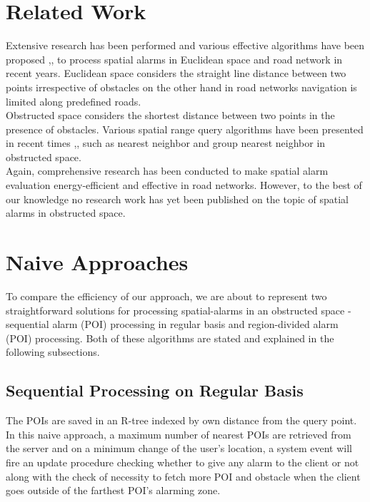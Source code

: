 \documentclass{sig-alternate}
\begin{document}
\section{Related Work}
Extensive research has been performed and various  effective algorithms have been proposed \cite{roadalarm},\cite{mur},\cite{bamba} to process spatial alarms in Euclidean space and road network in recent years. Euclidean space considers the straight line distance between two points irrespective of obstacles on the other hand in road networks navigation is limited along predefined roads.\\ Obstructed space considers the shortest distance between two points in the presence of obstacles. Various spatial range query algorithms have been presented in recent times \cite{obst1},\cite{obst2},\cite{ognn} such as nearest neighbor and group nearest neighbor in obstructed space.\\
Again, comprehensive research \cite{liu} has been conducted to make spatial alarm evaluation energy-efficient and effective in road networks. 
However, to the best of our knowledge no research work has yet been published on the topic of spatial alarms in obstructed space.
\\

\section{Naive Approaches}
To compare the efficiency of our approach, we are about to represent two straightforward solutions for processing spatial-alarms in an obstructed space - sequential alarm (POI) processing in regular basis and region-divided alarm (POI) processing. 
Both of these algorithms are stated and explained in the following subsections.


\subsection{Sequential Processing on Regular Basis}
The POIs are saved in an R-tree indexed by own distance from the query point. In this naive approach, a maximum number of nearest POIs are retrieved from the server and on a minimum change of the user's location, a system event will fire an update procedure checking whether to give any alarm to the client or not along with the check of necessity to fetch more POI and obstacle when the client goes outside of the farthest POI's alarming zone.
\end{document}

